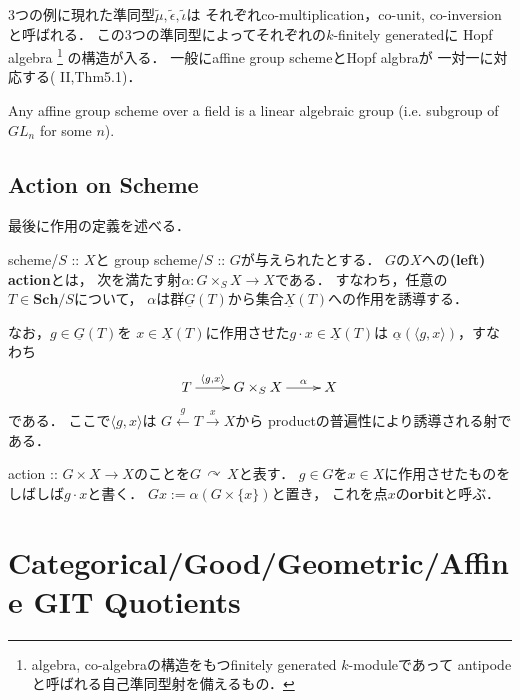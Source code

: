 \documentclass[a4paper]{jsarticle}
\newcommand{\Sch}{\mathbf{Sch}}
\newcommand{\func}[1]{\underline{#1}}
\newcommand{\acton}{\,\curvearrowright\,}
\begin{document}
    3つの例に現れた準同型$\tilde{\mu},\tilde{\epsilon},\tilde{\iota}$は
    それぞれco-multiplication，co-unit, co-inversionと呼ばれる．
    この3つの準同型によってそれぞれの$k$-finitely generatedに
    Hopf algebra
    \footnote
    {
        algebra, co-algebraの構造をもつfinitely generated $k$-moduleであって
        antipodeと呼ばれる自己準同型射を備えるもの．
    }
    の構造が入る．
    一般にaffine group schemeとHopf algbraが
    一対一に対応する(\cite{MilneAGS} II,Thm5.1)．

    \begin{Thm}
        Any affine group scheme over a field 
        is a linear algebraic group
        (i.e. subgroup of $GL_n$ for some $n$).
    \end{Thm}
    
    \subsection{Action on Scheme}
    最後に作用の定義を述べる．
    \begin{Def}
        scheme/$S$ :: $X$と
        group scheme/$S$ :: $G$が与えられたとする．
        $G$の$X$への\textbf{(left) action}とは，
        次を満たす射$\alpha: G \times_S X \to X$である．
        すなわち，任意の$T \in \Sch/S$について，
        $\alpha$は群$\func{G}(T)$から集合$\func{X}(T)$への作用を誘導する．

        なお，$g \in \func{G}(T)$を
        $x \in \func{X}(T)$に作用させた$g \cdot x \in \func{X}(T)$は
        $\func{\alpha}(\langle g,x \rangle)$，すなわち
        \[
        \xymatrix
        {
            T \ar[r]^-{\langle g,x \rangle}& G \times_S X \ar[r]^-{\alpha}& X
        }
        \]
        である．
        ここで$\langle g, x \rangle$は
        $G \xleftarrow{g} T \xrightarrow{x} X$から
        productの普遍性により誘導される射である．

        action :: $G \times X \to X$のことを$G \acton X$と表す．
        $g \in G$を$x \in X$に作用させたものをしばしば$g \cdot x$と書く．
        $Gx:=\alpha(G \times \{x\})$と置き，
        これを点$x$の\textbf{orbit}と呼ぶ．
    \end{Def}

\section{Categorical/Good/Geometric/Affine GIT Quotients}
\end{document}
